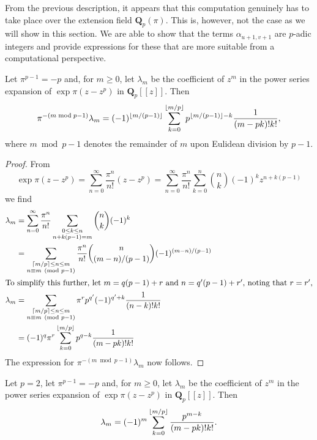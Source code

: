 From the previous description, it appears that this computation 
genuinely has to take place over the extension field 
$\mathbf{Q}_p(\pi)$.  This is, however, not the case as we 
will show in this section.  We are able to show that the terms 
$\alpha_{u+1,v+1}$ are $p$-adic integers and provide expressions 
for these that are more suitable from a computational perspective.  

\begin{lem} \label{lem:lambdam}
Let $\pi^{p-1} = -p$ and, for $m \geq 0$, let $\lambda_m$ 
be the coefficient of $z^m$ in the power series expansion 
of $\exp \pi (z - z^p)$ in $\mathbf{Q}_p[[z]]$.  Then 
\begin{equation*}
\pi^{- (m \bmod {p-1})} \lambda_m = (-1)^{\left\lfloor m/(p-1)\right\rfloor} \sum_{k=0}^{\left\lfloor m/p\right\rfloor} p^{\left\lfloor m/(p-1)\right\rfloor - k} \frac{1}{(m-pk)! k!},
\end{equation*}
where $m \bmod{p-1}$ denotes the remainder of $m$ upon Eulidean 
division by $p-1$.
\end{lem}

\begin{proof}
From
\begin{equation*}
\exp \pi (z - z^p) = \sum_{n=0}^{\infty} \frac{\pi^n}{n!} (z - z^p) 
                   = \sum_{n=0}^{\infty} \frac{\pi^n}{n!} \sum_{k=0}^n \binom{n}{k} (-1)^k z^{n + k(p-1)}
\end{equation*}
we find 
\begin{align*}
\lambda_m & = \sum_{n = 0}^{\infty} \frac{\pi^n}{n!} \sum_{\substack{0 \leq k \leq n\\n + k(p-1) = m}} \binom{n}{k} (-1)^k \\
          & = \sum_{\substack{\left\lceil m/p\right\rceil \leq n \leq m\\ n \equiv m \pmod{p-1}}} \frac{\pi^n}{n!} \binom{n}{(m-n)/(p-1)} (-1)^{(m-n)/(p-1)} \\
\intertext{To simplify this further, let $m = q(p-1) + r$ and $n = q'(p-1) + r'$, noting that $r = r'$,}
\lambda_m & = \sum_{\substack{\left\lceil m/p\right\rceil \leq n \leq m\\ n \equiv m \pmod{p-1}}} \pi^r p^{q'} (-1)^{q' + k} \frac{1}{(n-k)! k!} \\
          & = (-1)^q \pi^r \sum_{k=0}^{\left\lfloor m/p\right\rfloor} p^{q - k} \frac{1}{(m - pk)!k!}
\end{align*}
The expression for $\pi^{-(m \bmod{p-1})} \lambda_m$ now follows.
\end{proof}

\begin{cor} \label{cor:lambda2}
Let $p = 2$, let $\pi^{p-1} = -p$ and, for $m \geq 0$, let $\lambda_m$ 
be the coefficient of $z^m$ in the power series expansion of 
$\exp \pi (z - z^p)$ in $\mathbf{Q}_p[[z]]$.  Then 
\begin{equation*}
\lambda_m = (-1)^m \sum_{k=0}^{\left\lfloor m/p\right\rfloor} \frac{p^{m - k}}{(m - pk)! k!}.
\end{equation*}
\end{cor}

